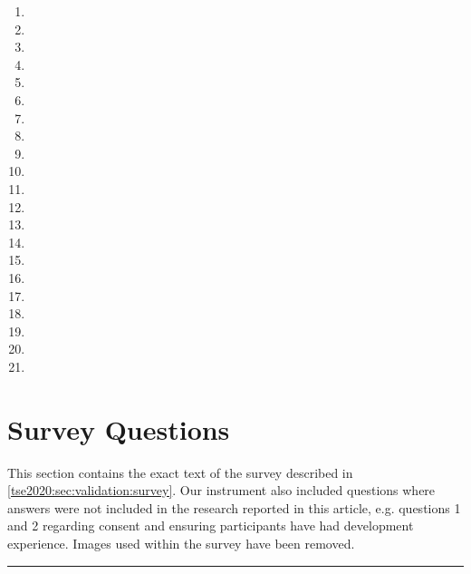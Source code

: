 \begin{enumerate}[label={S\arabic*.}]\footnotesize
\item {}
\item {}
\item {}
\item {}
\item {}
\item {}
\item {}
\item {}
\item {}
\item {}
\item {}
\item {}
\item {}
\item {}
\item {}
\item {}
\item {}
\item {}
\item {}
\item {}
\item {}
\end{enumerate}

\clearpage
\section{Survey Questions}\label{tse2020:sec:survey}

\def\AgreementScale{{\footnotesize \textit{[Strongly agree, Somewhat agree, Neither agree nor disagree, Somewhat disagree, Strongly disagree]}\bigskip}}

\noindent
This section contains the exact text of the survey described in \cref{tse2020:sec:validation:survey}. Our instrument also included questions where answers were not included in the research reported in this article, e.g. questions 1 and 2 regarding consent and ensuring participants have had development experience. Images used within the survey have been removed.

\bigskip
\hrule\sffamily\small

